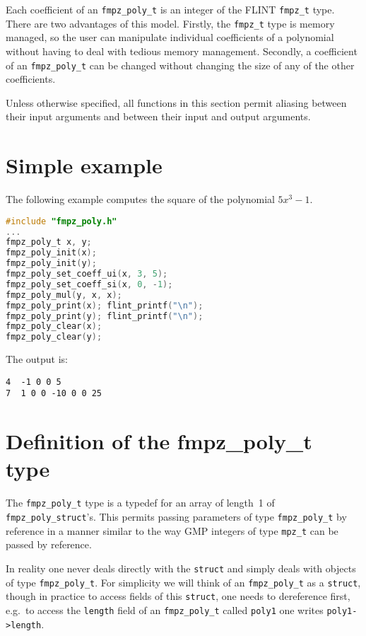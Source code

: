 \documentclass[a4paper,10pt]{book}
\newcommand{\code}{\lstinline}
\begin{document}
{{Each coefficient of an \code{fmpz_poly_t} is an integer of the FLINT
\code{fmpz_t} type.  There are two advantages of this model.  Firstly,
the \code{fmpz_t} type is memory managed, so the user can manipulate
individual coefficients of a polynomial without having to deal with
tedious memory management.  Secondly, a coefficient of an
\code{fmpz_poly_t} can be changed without changing the size of any
of the other coefficients.

Unless otherwise specified, all functions in this section permit aliasing
between their input arguments and between their input and output arguments.

\section{Simple example}

The following example computes the square of the polynomial $5x^3 - 1$.
\begin{lstlisting}[language=c]
#include "fmpz_poly.h"
...
fmpz_poly_t x, y;
fmpz_poly_init(x);
fmpz_poly_init(y);
fmpz_poly_set_coeff_ui(x, 3, 5);
fmpz_poly_set_coeff_si(x, 0, -1);
fmpz_poly_mul(y, x, x);
fmpz_poly_print(x); flint_printf("\n");
fmpz_poly_print(y); flint_printf("\n");
fmpz_poly_clear(x);
fmpz_poly_clear(y);
\end{lstlisting}

The output is:
\begin{lstlisting}
4  -1 0 0 5
7  1 0 0 -10 0 0 25
\end{lstlisting}

\section{Definition of the fmpz\_poly\_t type}

The \code{fmpz_poly_t} type is a typedef for an array of length~1 of
\code{fmpz_poly_struct}'s.  This permits passing parameters of type
\code{fmpz_poly_t} by reference in a manner similar to the way GMP integers
of type \code{mpz_t} can be passed by reference.

In reality one never deals directly with the \code{struct} and simply deals
with objects of type \code{fmpz_poly_t}.  For simplicity we will think of an
\code{fmpz_poly_t} as a \code{struct}, though in practice to access fields
of this \code{struct}, one needs to dereference first, e.g.\ to access the
\code{length} field of an \code{fmpz_poly_t} called \code{poly1} one writes
\code{poly1->length}.

}}
\end{document}

